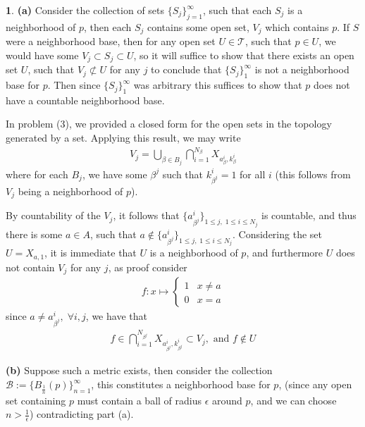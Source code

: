 \documentclass[10.5pt]{article}
\theoremstyle{definition}
\newtheorem{pb}{}
\newcommand{\set}[1]{\{#1\}}
\newcommand{\tand}{\text{ and }}
\begin{document}
    \begin{pb}
        \textbf{(a)} Consider the collection of sets \(\set{S_j}_{j=1}^\infty\), such that each \(S_j\) is a neighborhood of \(p\), then each \(S_j\) contains some open set, \(V_j\) which contains \(p\). If \(S\) were a neighborhood base, then for any open set \(U \in \mathcal{T}\), such that \(p \in U\), we would have some \(V_j \subset S_j \subset U\), so it will suffice to show that there exists an open set \(U\), such that \(V_j \not \subset U\) for any \(j\) to conclude that \(\set{S_j}_1^\infty\) is not a neighborhood base for \(p\). Then since \(\set{S_j}_1^\infty\) was arbitrary this suffices to show that \(p\) does not have a countable neighborhood base.

        In problem (3), we provided a closed form for the open sets in the topology generated by a set. Applying this result, we may write
        \begin{align*}
            V_j = \bigcup_{\beta \in B_j}\bigcap_{i = 1}^{N_{\beta}} X_{a^i_{\beta},k^i_{\beta}}
        \end{align*}
        where for each \(B_j\), we have some \(\beta^j\) such that \(k^i_{\beta^j} = 1\) for all \(i\) (this follows from \(V_j\) being a neighborhood of \(p\)).

        By countability of the \(V_j\), it follows that \(\set{a^i_{\beta^j}}_{1 \leq j, \; 1 \leq i \leq N_j}\) is countable, and thus there is some \(a \in A\), such that \(a \not \in \set{a^i_{\beta^j}}_{1 \leq j, \; 1 \leq i \leq N_j}\). Considering the set \(U = X_{a,1}\), it is immediate that \(U\) is a neighborhood of \(p\), and furthermore \(U\) does not contain \(V_j\) for any \(j\), as proof consider
        \begin{align*}
            f:x \mapsto \begin{cases}
                1 & x \neq a \\
                0 & x = a
            \end{cases}
        \end{align*}
        since \(a \neq a^i_{\beta^j}, \; \forall i,j\), we have that
        \begin{align*}
            f \in \bigcap_{i = 1}^{N_{\beta^j}} X_{a^i_{\beta^j},k^i_{\beta^j}} \subset V_j, \tand
            f \not \in U
        \end{align*}

        \textbf{(b)} Suppose such a metric exists, then consider the collection
            \(\mathcal{B} := \set{B_{\frac{1}{n}}(p)}_{n=1}^\infty\), this constitutes a neighborhood base for \(p\), (since any open set containing \(p\) must contain a ball of radius \(\epsilon\) around \(p\), and we can choose \(n > \frac{1}{\epsilon}\)) contradicting part (a).


\end{pb}
\end{document}
